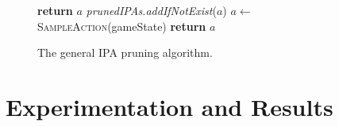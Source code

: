 \documentclass[conference]{IEEEtran}
\newcommand{\squeezeup}{\vspace{-2.0mm}}
\begin{document}



\begin{figure}
\begin{algorithm}[H]
\label{pruningAlgorithm}
\caption{The general IPA pruning algorithm.}
\begin{algorithmic}[1]
 
		 \textbf{return} $a$ \EndIf
				\State \textit{prunedIPAs.addIfNotExist}($a$)
				\State $a\gets$ \textsc{SampleAction}(gameState)
			\EndWhile
		\EndIf
	\EndIf
	\State \textbf{return} $a$
\EndFunction
\end{algorithmic}
\end{algorithm}
\squeezeup
\end{figure}%




\section{Experimentation and Results}
\label{sec:experiments}

\end{document}
